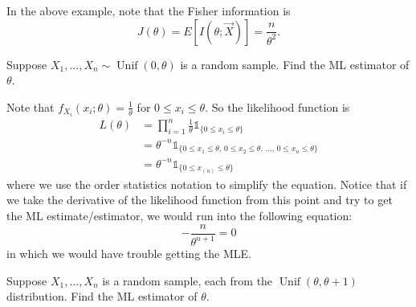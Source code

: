 \documentclass[notoc,notitlepage]{tufte-book}
\DeclareMathOperator{\Unif}{Unif }
\begin{document}
\begin{note}
  In the above example, note that the Fisher information is
  \begin{equation*}
    J(\theta) = E[I(\theta; \vec{X})] = \frac{n}{\theta^2}.
  \end{equation*}
\end{note}

\begin{eg}\label{eg:eg_where_derivatives_for_mle_fail}
  Suppose $X_1, ..., X_n \sim \Unif(0, \theta)$ is a random sample. Find the ML estimator of $\theta$.
\end{eg}

\begin{solution}
  Note that $f_{X_i}(x_i; \theta) = \frac{1}{\theta}$ for $0 \leq x_i \leq \theta$. So the likelihood function is
  \begin{align*}
    L(\theta) &= \prod_{i=1}^{n} \frac{1}{\theta} \mathbb{1}_{\{0 \leq x_i \leq \theta\}} \\
              &= \theta^{-n} \mathbb{1}_{\{ 0 \leq x_1 \leq \theta, \, 0 \leq x_2 \leq \theta, \, ..., \, 0 \leq x_n \leq \theta\}} \\
              &= \theta^{-n} \mathbb{1}_{\{0 \leq x_{(n)} \leq \theta\}}
  \end{align*}
  where we use the order statistics notation to simplify the equation. Notice that if we take the derivative of the likelihood function from this point and try to get the ML estimate/estimator, we would run into the following equation:
  \begin{equation*}
    - \frac{n}{\theta^{n + 1}} = 0
  \end{equation*}
  in which we would have trouble getting the MLE.
\end{solution}

\begin{eg}[Example 6.8]
  Suppose $X_1, ..., X_n$ is a random sample, each from the $\Unif(\theta, \theta + 1)$ distribution. Find  the ML estimator of $\theta$.
\end{eg}
\end{document}
